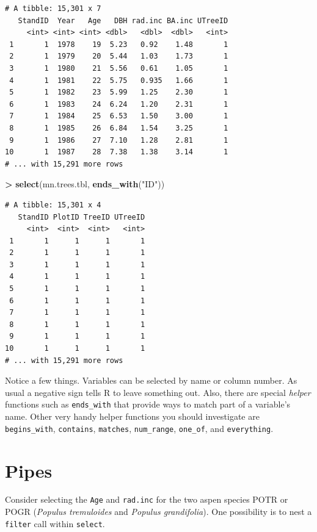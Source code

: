 \documentclass[]{krantz}
\makeatletter
\newenvironment{Shaded}{\begin{snugshade}}{\end{snugshade}}
\newcommand{\KeywordTok}[1]{\textcolor[rgb]{0.27,0.27,0.27}{\textbf{#1}}}
\newcommand{\StringTok}[1]{\textcolor[rgb]{0.5,0.5,0.5}{#1}}
\newcommand{\OperatorTok}[1]{\textcolor[rgb]{0.43,0.43,0.43}{\textbf{#1}}}
\newcommand{\NormalTok}[1]{#1}
\newenvironment{kframe}{%
\medskip{}
\setlength{\fboxsep}{.8em}
 \def\at@end@of@kframe{}%
 \ifinner\ifhmode%
  \def\at@end@of@kframe{\end{minipage}}%
  \begin{minipage}{\columnwidth}%
 \fi\fi%
 \def\FrameCommand##1{\hskip\@totalleftmargin \hskip-\fboxsep
 \colorbox{shadecolor}{##1}\hskip-\fboxsep
     \hskip-\linewidth \hskip-\@totalleftmargin \hskip\columnwidth}%
 \MakeFramed {\advance\hsize-\width
   \@totalleftmargin\z@ \linewidth\hsize
   \@setminipage}}%
 {\par\unskip\endMakeFramed%
 \at@end@of@kframe}
\renewenvironment{Shaded}{\begin{kframe}}{\end{kframe}}
\theoremstyle{definition}
\theoremstyle{definition}
\theoremstyle{definition}
\theoremstyle{remark}
\makeatother
\begin{document}
\begin{verbatim}
# A tibble: 15,301 x 7
   StandID  Year   Age   DBH rad.inc BA.inc UTreeID
     <int> <int> <int> <dbl>   <dbl>  <dbl>   <int>
 1       1  1978    19  5.23   0.92    1.48       1
 2       1  1979    20  5.44   1.03    1.73       1
 3       1  1980    21  5.56   0.61    1.05       1
 4       1  1981    22  5.75   0.935   1.66       1
 5       1  1982    23  5.99   1.25    2.30       1
 6       1  1983    24  6.24   1.20    2.31       1
 7       1  1984    25  6.53   1.50    3.00       1
 8       1  1985    26  6.84   1.54    3.25       1
 9       1  1986    27  7.10   1.28    2.81       1
10       1  1987    28  7.38   1.38    3.14       1
# ... with 15,291 more rows
\end{verbatim}

\begin{Shaded}
\begin{Highlighting}[]
\OperatorTok{>}\StringTok{ }\KeywordTok{select}\NormalTok{(mn.trees.tbl, }\KeywordTok{ends_with}\NormalTok{(}\StringTok{"ID"}\NormalTok{))}
\end{Highlighting}
\end{Shaded}

\begin{verbatim}
# A tibble: 15,301 x 4
   StandID PlotID TreeID UTreeID
     <int>  <int>  <int>   <int>
 1       1      1      1       1
 2       1      1      1       1
 3       1      1      1       1
 4       1      1      1       1
 5       1      1      1       1
 6       1      1      1       1
 7       1      1      1       1
 8       1      1      1       1
 9       1      1      1       1
10       1      1      1       1
# ... with 15,291 more rows
\end{verbatim}

Notice a few things. Variables can be selected by name or column number.
As usual a negative sign tells R to leave something out. Also, there are
special \emph{helper} functions such as \texttt{ends\_with} that provide
ways to match part of a variable's name. Other very handy helper
functions you should investigate are \texttt{begins\_with},
\texttt{contains}, \texttt{matches}, \texttt{num\_range},
\texttt{one\_of}, and \texttt{everything}.

\section{Pipes}\label{pipes}

Consider selecting the \texttt{Age} and \texttt{rad.inc} for the two
aspen species POTR or POGR (\emph{Populus tremuloides} and \emph{Populus
grandifolia}). One possibility is to nest a \texttt{filter} call within
\texttt{select}.
\end{document}
